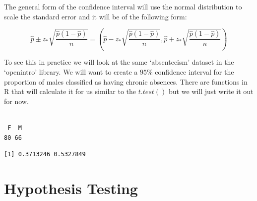 \documentclass[
  letterpaper,
  DIV=11,
  numbers=noendperiod]{scrreprt}
\newenvironment{Shaded}{\begin{snugshade}}{\end{snugshade}}
\newcommand{\DecValTok}[1]{\textcolor[rgb]{0.68,0.00,0.00}{#1}}
\newcommand{\FunctionTok}[1]{\textcolor[rgb]{0.28,0.35,0.67}{#1}}
\newcommand{\NormalTok}[1]{\textcolor[rgb]{0.00,0.23,0.31}{#1}}
\newcommand{\OtherTok}[1]{\textcolor[rgb]{0.00,0.23,0.31}{#1}}
\newcommand{\SpecialCharTok}[1]{\textcolor[rgb]{0.37,0.37,0.37}{#1}}
\begin{document}
The general form of the confidence interval will use the normal
distribution to scale the standard error and it will be of the following
form:

\[ \hat{p} \pm z_* \sqrt{\frac{\hat{p}(1-\hat{p})}{n}} = \left(\hat{p} - z_* \sqrt{\frac{\hat{p}(1-\hat{p})}{n}}, \hat{p} + z_* \sqrt{\frac{\hat{p}(1-\hat{p})}{n}}\right) \]

To see this in practice we will look at the same `absenteeism' dataset
in the `openintro' library. We will want to create a \(95\%\) confidence
interval for the proportion of males classified as having chronic
absences. There are functions in R that will calculate it for us similar
to the \(t.test()\) but we will just write it out for now.

\begin{Shaded}
\end{Shaded}

\begin{verbatim}

 F  M 
80 66 
\end{verbatim}

\begin{Shaded}
\end{Shaded}

\begin{verbatim}
[1] 0.3713246 0.5327849
\end{verbatim}


\chapter{Hypothesis Testing}\label{hypothesis-testing}
\end{document}
